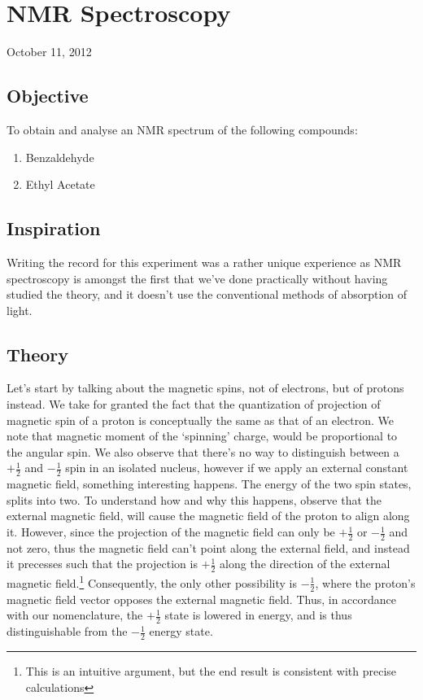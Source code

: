 \chapter{NMR Spectroscopy}
\begin{flushright}
October 11, 2012
\end{flushright}
\section{Objective}
To obtain and analyse an NMR spectrum of the following compounds:
	\begin{enumerate}
		\item Benzaldehyde
		\item Ethyl Acetate
	\end{enumerate}

\section{Inspiration}
	Writing the record for this experiment was a rather unique experience as NMR spectroscopy is amongst the first that we've done practically without having studied the theory, and it doesn't use the conventional methods of absorption of light.

\section{Theory}
	Let's start by talking about the magnetic spins, not of electrons, but of protons instead. We take for granted the fact that the quantization of projection of magnetic spin of a proton is conceptually the same as that of an electron. We note that magnetic moment of the `spinning' charge, would be proportional to the angular spin. We also observe that there's no way to distinguish between a $+\frac{1}{2}$ and $-\frac{1}{2}$ spin in an isolated nucleus, however if we apply an external constant magnetic field, something interesting happens. The energy of the two spin states, splits into two. To understand how and why this happens, observe that the external magnetic field, will cause the magnetic field of the proton to align along it. However, since the projection of the magnetic field can only be $+\frac{1}{2}$ or $-\frac{1}{2}$  and not zero, thus the magnetic field can't point along the external field, and instead it precesses such that the projection is $+\frac{1}{2}$ along the direction of the external magnetic field.\footnote{This is an intuitive argument, but the end result is consistent with precise calculations} Consequently, the only other possibility is $-\frac{1}{2}$, where the proton's magnetic field vector opposes the external magnetic field. Thus, in accordance with our nomenclature, the $+\frac{1}{2}$ state is lowered in energy, and is thus distinguishable from the $-\frac{1}{2}$ energy state.
